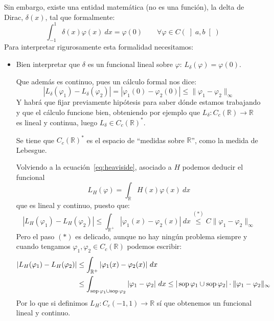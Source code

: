 \noindent
Sin embargo, existe una entidad matemática (no es una función), la delta de Dirac, $\delta(x)$, tal que formalmente:
\begin{equation*}
    \int_{-1}^{1} \delta(x)\varphi(x)~dx = \varphi(0) \qquad \forall \varphi \in C(\left]a,b\right[)
\end{equation*}
Para interpretar rigurosamente esta formalidad necesitamos:
\begin{itemize}
    \item Bien interpretar que $\delta$ es un funcional lineal sobre $\varphi$: $L_\delta(\varphi) = \varphi(0)$.

        Que además es continuo, pues un cálculo formal nos dice:
        \begin{equation*}
            |L_\delta(\varphi_1) - L_\delta(\varphi_2)| = |\varphi_1(0) - \varphi_2(0)| \leq \|\varphi_1-\varphi_2\|_\infty
        \end{equation*}
        Y habrá que fijar previamente hipótesis para saber dónde estamos trabajando y que el cálculo funcione bien, obteniendo por ejemplo que $L_\delta:C_c(\mathbb{R})\to\mathbb{R}$ es lineal y continua, luego $L_\delta \in C_c(\mathbb{R})^\ast$.

        Se tiene que $C_c(\mathbb{R})^\ast$ es el espacio de ``medidas sobre $\mathbb{R}$'', como la medida de Lebesgue.

        Volviendo a la ecuación~\eqref{eq:heaviside}, asociado a $H$ podemos deducir el funcional
        \begin{equation*}
            L_H(\varphi) = \int_\mathbb{R} H(x)\varphi(x)~dx
        \end{equation*}
        que es lineal y continuo, puesto que:
        \begin{equation*}
            |L_H(\varphi_1) - L_H(\varphi_2)| \leq \int_{\mathbb{R}^+}|\varphi_1(x) - \varphi_2(x)|~dx \stackrel{(\ast)}{\leq} C\|\varphi_1-\varphi_2\|_\infty
        \end{equation*}
        Pero el paso $(\ast)$ es delicado, aunque no hay ningún problema siempre y cuando tengamos $\varphi_1,\varphi_2\in C_c(\mathbb{R})$ podemos escribir:
        \begin{align*}
            |L_H(\varphi_1) - L_H(\varphi_2)| &\leq \int_{\mathbb{R}^+}|\varphi_1(x) - \varphi_2(x)|~dx \\ 
            &\leq \int_{\operatorname{sop}\varphi_1\cup\operatorname{sop}\varphi_2}|\varphi_1-\varphi_2|~dx \leq |\operatorname{sop}\varphi_1\cup\operatorname{sop}\varphi_2|\cdot  \|\varphi_1-\varphi_2\|_\infty
        \end{align*}
        Por lo que si definimos $L_H:C_c(-1,1)\to \mathbb{R}$ sí que obtenemos un funcional lineal y continuo.


\end{itemize}
